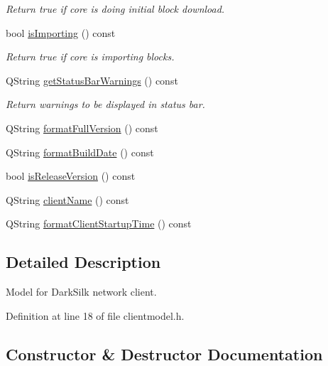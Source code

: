 \begin{DoxyCompactItemize}
\begin{DoxyCompactList}\small\item\em Return true if core is doing initial block download. \end{DoxyCompactList}\item 
bool \hyperlink{class_client_model_aaf4587934ea90ba6ceeee4e4a950ab6b}{is\+Importing} () const 
\begin{DoxyCompactList}\small\item\em Return true if core is importing blocks. \end{DoxyCompactList}\item 
Q\+String \hyperlink{class_client_model_ae44eb0943b8528d5a0b22d063e5cc95c}{get\+Status\+Bar\+Warnings} () const 
\begin{DoxyCompactList}\small\item\em Return warnings to be displayed in status bar. \end{DoxyCompactList}\item 
Q\+String \hyperlink{class_client_model_a1c93d11fd03ef9aabf9b694e73698710}{format\+Full\+Version} () const 
\item 
Q\+String \hyperlink{class_client_model_a8b7886e6acbb255dab6cbc297bb67a22}{format\+Build\+Date} () const 
\item 
bool \hyperlink{class_client_model_ab3b37f93614c973c8b39295eeaa7bfc1}{is\+Release\+Version} () const 
\item 
Q\+String \hyperlink{class_client_model_a6c7619b3dbe33ce32456ec1f7a17f454}{client\+Name} () const 
\item 
Q\+String \hyperlink{class_client_model_a9a6238dec8eb12b7d742ce1879a92ec8}{format\+Client\+Startup\+Time} () const 
\end{DoxyCompactItemize}


\subsection{Detailed Description}
Model for Dark\+Silk network client. 

Definition at line 18 of file clientmodel.\+h.



\subsection{Constructor \& Destructor Documentation}
\hypertarget{class_client_model_aec1d32d5dc8c094eba66036a19a22854}{}
